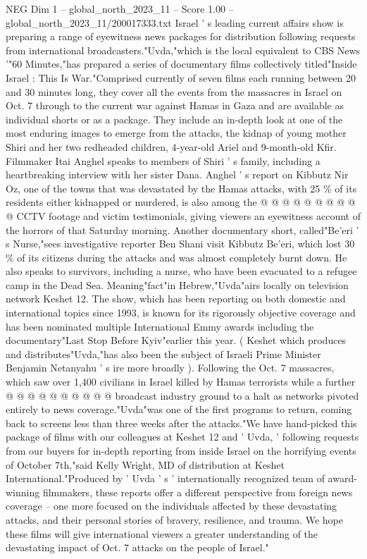 \begin{textsample}{NEG Dim 1 – global\_north\_2023\_11 – Score 1.00 – global\_north\_2023\_11/200017333.txt}  \label{ex:f1_neg_105}
Israel ' s leading current affairs show is preparing a range of eyewitness news packages for distribution following requests from international broadcasters."Uvda,"which is the local equivalent to CBS News '"60 Minutes,"has prepared a series of documentary films collectively titled"Inside Israel : This Is War."Comprised currently of seven films each running between 20 and 30 minutes long, they cover all the events from the massacres in Israel on Oct. 7 through to the current war against Hamas in Gaza and are available as individual shorts or as a package.
They include an in-depth look at one of the most enduring images to emerge from the attacks, the kidnap of young mother Shiri and her two redheaded children, 4-year-old Ariel and 9-month-old Kfir.
Filmmaker Itai Anghel speaks to members of Shiri ' s family, including a heartbreaking interview with her sister Dana.
Anghel ' s report on Kibbutz Nir Oz, one of the towns that was devastated by the Hamas attacks, with 25 \% of its residents either kidnapped or murdered, is also among the @ @ @ @ @ @ @ @ @ @ CCTV footage and victim testimonials, giving viewers an eyewitness account of the horrors of that Saturday morning.
Another documentary short, called"Be'eri ' s Nurse,"sees investigative reporter Ben Shani visit Kibbutz Be'eri, which lost 30 \% of its citizens during the attacks and was almost completely burnt down.
He also speaks to survivors, including a nurse, who have been evacuated to a refugee camp in the Dead Sea.
Meaning"fact"in Hebrew,"Uvda"airs locally on television network Keshet 12.
The show, which has been reporting on both domestic and international topics since 1993, is known for its rigorously objective coverage and has been nominated multiple International Emmy awards including the documentary"Last Stop Before Kyiv"earlier this year. ( Keshet which produces and distributes"Uvda,"has also been the subject of Israeli Prime Minister Benjamin Netanyahu ' s ire more broadly ).
Following the Oct. 7 massacres, which saw over 1,400 civilians in Israel killed by Hamas terrorists while a further @ @ @ @ @ @ @ @ @ @ broadcast industry ground to a halt as networks pivoted entirely to news coverage."Uvda"was one of the first programs to return, coming back to screens less than three weeks after the attacks."We have hand-picked this package of films with our colleagues at Keshet 12 and ' Uvda, ' following requests from our buyers for in-depth reporting from inside Israel on the horrifying events of October 7th,"said Kelly Wright, MD of distribution at Keshet International."Produced by ' Uvda ' s ' internationally recognized team of award-winning filmmakers, these reports offer a different perspective from foreign news coverage -- one more focused on the individuals affected by these devastating attacks, and their personal stories of bravery, resilience, and trauma.
We hope these films will give international viewers a greater understanding of the devastating impact of Oct. 7 attacks on the people of Israel."

\end{textsample}
